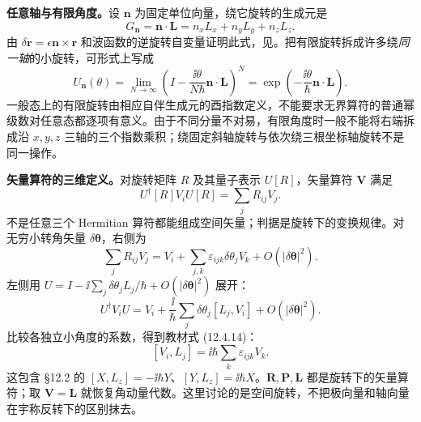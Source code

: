 \textbf{任意轴与有限角度。}设 $\mathbf n$ 为固定单位向量，绕它旋转的生成元是
\begin{equation}
  \boxed{G_{\mathbf n}=\mathbf n\cdot\mathbf L
    =n_xL_x+n_yL_y+n_zL_z.}
  \label{eq:QM-C12-S04-axis-generator}
\end{equation}
由 $\delta\mathbf r=\epsilon\mathbf n\times\mathbf r$ 和波函数的逆旋转自变量证明此式，见。把有限旋转拆成许多绕\emph{同一轴}的小旋转，可形式上写成
\begin{equation}
  U_{\mathbf n}(\theta)
  =\lim_{N\to\infty}\left(I-\frac{\ii\theta}{N\hbar}
    \mathbf n\cdot\mathbf L\right)^N
  =\boxed{\exp\!\left(-\frac{\ii\theta}{\hbar}
    \mathbf n\cdot\mathbf L\right)}.
  \label{eq:QM-C12-S04-finite-rotation}
\end{equation}
一般态上的有限旋转由相应自伴生成元的酉指数定义，不能要求无界算符的普通幂级数对任意态都逐项有意义。由于不同分量不对易，有限角度时一般不能将右端拆成沿 $x,y,z$ 三轴的三个指数乘积；绕固定斜轴旋转与依次绕三根坐标轴旋转不是同一操作。

\textbf{矢量算符的三维定义。}对旋转矩阵 $R$ 及其量子表示 $U[R]$，矢量算符 $\mathbf V$ 满足
\begin{equation}
  \boxed{U^\dagger[R]V_iU[R]=\sum_jR_{ij}V_j.}
  \label{eq:QM-C12-S04-vector-law}
\end{equation}
不是任意三个 Hermitian 算符都能组成空间矢量；判据是旋转下的变换规律。对无穷小转角矢量 $\delta\boldsymbol\theta$，右侧为
\begin{equation}
  \sum_jR_{ij}V_j
  =V_i+\sum_{j,k}\varepsilon_{ijk}\delta\theta_j V_k
    +O(|\delta\boldsymbol\theta|^2).
\end{equation}
左侧用 $U=I-\ii\sum_j\delta\theta_jL_j/\hbar+O(|\delta\boldsymbol\theta|^2)$ 展开：
\begin{equation}
  U^\dagger V_iU
  =V_i+\frac{\ii}{\hbar}\sum_j\delta\theta_j[L_j,V_i]
    +O(|\delta\boldsymbol\theta|^2).
\end{equation}
比较各独立小角度的系数，得到教材式 (12.4.14)：
\begin{equation}
  \boxed{[V_i,L_j]=\ii\hbar\sum_k\varepsilon_{ijk}V_k.}
\end{equation}
这包含 \S 12.2 的 $[X,L_z]=-\ii\hbar Y$、$[Y,L_z]=\ii\hbar X$。$\mathbf R,\mathbf P,\mathbf L$ 都是旋转下的矢量算符；取 $\mathbf V=\mathbf L$ 就恢复角动量代数。这里讨论的是空间旋转，不把极向量和轴向量在宇称反转下的区别抹去。

